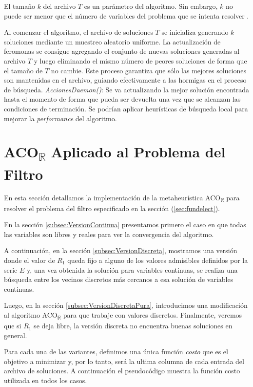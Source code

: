 \documentclass{llncs}
\begin{document}
	El tamaño $k$ del archivo $T$ es un parámetro del algoritmo. Sin embargo, $k$ no puede ser menor que el número de variables
	del problema que se intenta resolver \cite{soc:dor}.
	
	Al comenzar el algoritmo, el archivo de soluciones $T$ se inicializa generando $k$ soluciones mediante un muestreo aleatorio uniforme.
	La actualización de feromonas se consigue agregando el conjunto de nuevas soluciones generadas al archivo $T$ y luego eliminando
	el mismo número de peores soluciones de forma que el tamaño de $T$ no cambie. Este proceso garantiza que sólo las mejores
	soluciones son mantenidas en el archivo, guiando efectivamente a las hormigas en el proceso de búsqueda.
	\bigbreak
	\textit{AccionesDaemon()}: Se va actualizando la mejor solución encontrada hasta el momento de forma que pueda ser devuelta
	una vez que se alcanzan las condiciones de terminación. Se podrían aplicar heurísticas de búsqueda local para mejorar la \textit{performance} del algoritmo.
	
	\section{\textbf{ACO\textsubscript{$\mathbb{R}$} Aplicado al Problema del Filtro}}
	En esta sección detallamos la implementación de la metaheurística ACO\textsubscript{$\mathbb{R}$} 
	para resolver el problema del filtro especificado en la sección (\ref{sec:fundelect}).
	
	En la sección \ref{subsec:VersionContinua} presentamos primero el caso en que todas las variables 
	son libres y reales para ver la convergencia del algoritmo. 
	
	A continuación, en la sección \ref{subsec:VersionDiscreta}, mostramos una versión donde el valor de $R_1$ 
	queda fijo a alguno de los valores admisibles definidos por la serie $E$ y, una vez obtenida la solución para variables continuas, 
	se realiza una búsqueda entre los vecinos discretos más cercanos a esa solución de variables continuas.
	
	Luego, en la sección \ref{subsec:VersionDiscretaPura}, introducimos una modificación al algoritmo 
	ACO\textsubscript{$\mathbb{R}$} para que trabaje con valores discretos. 
	Finalmente, veremos que si $R_1$ se deja libre, la versión discreta no encuentra buenas soluciones en general.
	
	Para cada una de las variantes, definimos una única función \textit{costo} que es el objetivo a minimizar y, por lo tanto, 
	será la ultima columna	de cada entrada del archivo de soluciones. A continuación el pseudocódigo muestra la 
	función costo utilizada en todos los casos.
	
\end{document}
